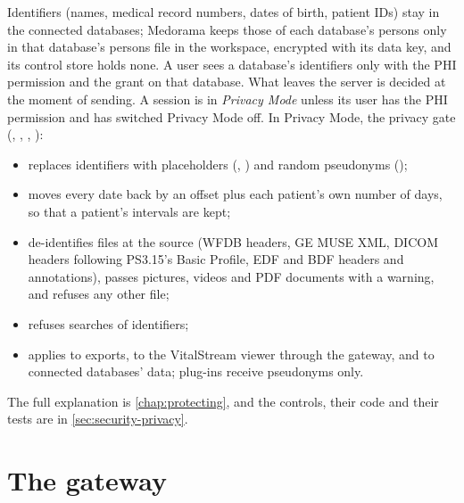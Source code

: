 Identifiers (names, medical record numbers, dates of birth, patient IDs) stay in the connected
databases; Medorama keeps those of each database's persons only in that database's persons file
in the workspace, encrypted with its data key, and its control store holds none. A user sees a
database's identifiers only with the PHI permission and the  grant on that database.
What leaves the server is decided at the moment of sending. A session is in \emph{Privacy Mode} unless its user has the PHI permission and
has switched Privacy Mode off. In Privacy Mode, the privacy gate (, ,
, ):
\begin{itemize}
\item replaces identifiers with placeholders (, \code{[MRN]}) and random
  pseudonyms ();
\item moves every date back by an offset plus each patient's own number of days, so
  that a patient's intervals are kept;
\item de-identifies files at the source (WFDB headers, GE MUSE XML, DICOM headers following
  PS3.15's Basic Profile, EDF and BDF headers and annotations), passes pictures, videos and PDF
  documents with a warning, and refuses any other file;
\item refuses searches of identifiers;
\item applies to exports, to the VitalStream viewer through the gateway, and to connected
  databases' data; plug-ins receive pseudonyms only.
\end{itemize}
The full explanation is \cref{chap:protecting}, and the controls, their code and their tests are
in \cref{sec:security-privacy}.

\section{The gateway}
\label{sec:architecture-gateway}

